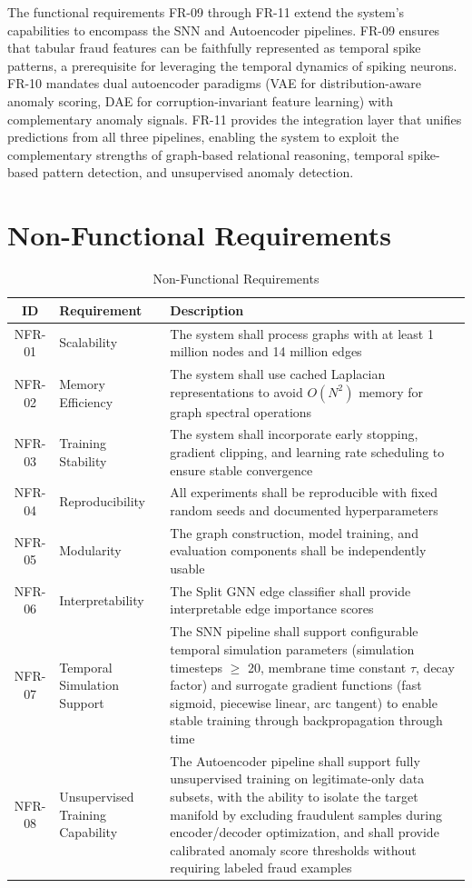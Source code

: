 The functional requirements FR-09 through FR-11 extend the system's capabilities to encompass the SNN and Autoencoder pipelines. FR-09 ensures that tabular fraud features can be faithfully represented as temporal spike patterns, a prerequisite for leveraging the temporal dynamics of spiking neurons. FR-10 mandates dual autoencoder paradigms (VAE for distribution-aware anomaly scoring, DAE for corruption-invariant feature learning) with complementary anomaly signals. FR-11 provides the integration layer that unifies predictions from all three pipelines, enabling the system to exploit the complementary strengths of graph-based relational reasoning, temporal spike-based pattern detection, and unsupervised anomaly detection.

\section{Non-Functional Requirements}

\begin{table}[H]
\centering
\caption{Non-Functional Requirements}
\label{tab:nonfunctional-reqs}
\small
\begin{tabularx}{\textwidth}{clL}
\toprule
\textbf{ID} & \textbf{Requirement} & \textbf{Description} \\
\midrule
NFR-01 & Scalability & The system shall process graphs with at least 1 million nodes and 14 million edges \\
NFR-02 & Memory Efficiency & The system shall use cached Laplacian representations to avoid $O(N^2)$ memory for graph spectral operations \\
NFR-03 & Training Stability & The system shall incorporate early stopping, gradient clipping, and learning rate scheduling to ensure stable convergence \\
NFR-04 & Reproducibility & All experiments shall be reproducible with fixed random seeds and documented hyperparameters \\
NFR-05 & Modularity & The graph construction, model training, and evaluation components shall be independently usable \\
NFR-06 & Interpretability & The Split GNN edge classifier shall provide interpretable edge importance scores \\
NFR-07 & Temporal Simulation Support & The SNN pipeline shall support configurable temporal simulation parameters (simulation timesteps $\geq$ 20, membrane time constant $\tau$, decay factor) and surrogate gradient functions (fast sigmoid, piecewise linear, arc tangent) to enable stable training through backpropagation through time \\
NFR-08 & Unsupervised Training Capability & The Autoencoder pipeline shall support fully unsupervised training on legitimate-only data subsets, with the ability to isolate the target manifold by excluding fraudulent samples during encoder/decoder optimization, and shall provide calibrated anomaly score thresholds without requiring labeled fraud examples \\
\bottomrule
\end{tabularx}
\end{table}

